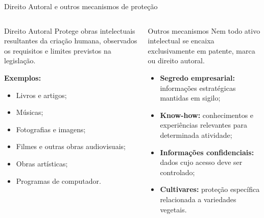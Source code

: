 \documentclass[9pt]{beamer}
\begin{document}
\begin{frame}{Direito Autoral e outros mecanismos de proteção}

  \begin{columns}[T]


    \begin{block}{Direito Autoral}
      \small
      Protege obras intelectuais resultantes da criação
      humana, observados os requisitos e limites previstos
      na legislação.

      \vspace{0.15cm}

      \textbf{Exemplos:}
      \begin{itemize}
        \item Livros e artigos;
        \item Músicas;
        \item Fotografias e imagens;
        \item Filmes e outras obras audiovisuais;
        \item Obras artísticas;
        \item Programas de computador.
      \end{itemize}
    \end{block}


    \begin{block}{Outros mecanismos}
      \small
      Nem todo ativo intelectual se encaixa exclusivamente
      em patente, marca ou direito autoral.

      \vspace{0.15cm}

      \begin{itemize}
        \item \textbf{Segredo empresarial:} informações estratégicas
        mantidas em sigilo;
        \item \textbf{Know-how:} conhecimentos e experiências
        relevantes para determinada atividade;
        \item \textbf{Informações confidenciais:} dados cujo acesso
        deve ser controlado;
        \item \textbf{Cultivares:} proteção específica relacionada
        a variedades vegetais.
      \end{itemize}
    \end{block}


\end{columns}
\end{frame}
\end{document}

